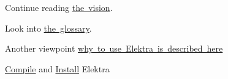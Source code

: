 \begin{DoxyItemize}
\item Continue reading \mbox{\hyperlink{doc_VISION_md}{the vision}}.
\item Look into \mbox{\hyperlink{doc_help_elektra-glossary_md}{the glossary}}.
\item Another viewpoint \mbox{\hyperlink{doc_help_elektra-introduction_md}{why to use Elektra is described here}}
\item \mbox{\hyperlink{doc_COMPILE_md}{Compile}} and \mbox{\hyperlink{doc_INSTALL_md}{Install}} Elektra 
\end{DoxyItemize}